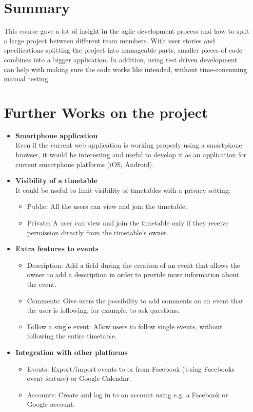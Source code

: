 
\section{Summary}
\vspace{-5mm}
This course gave a lot of insight in the agile development process and how to split a large project between different team members. With user stories and specifications splitting the project into manageable parts, smaller pieces of code combines into a bigger application. In addition, using test driven development can help with making sure the code works like intended, without time-consuming manual testing.

\section{Further Works on the project}
\vspace{-5mm}
\begin{itemize}
\item \textbf{Smartphone application}\\ Even if the current web application is working properly using a smartphone browser, it would be interesting and useful to develop it as an application for current smartphone platforms (iOS, Android).
\item \textbf{Visibility of a timetable}\\
It could be useful to limit visibility of timetables with a privacy setting:
\vspace{-3mm}
\begin{itemize}
	\item Public: All the users can view and join the timetable.
	\item Private: A user can view and join the timetable only if they receive permission directly from the timetable's owner.
\end{itemize}
\item \textbf{Extra features to events}
\vspace{-3mm}
\begin{itemize}
	\item Description: Add a field during the creation of an event that allows the owner to add a description in order to provide more information about the event.
	\item Comments: Give users the possibility to add comments on an event that the user is following, for example, to ask questions.
	\item Follow a single event: Allow users to follow single events, without following the entire timetable.
\end{itemize}
\item \textbf{Integration with other platforms}
\vspace{-3mm}
\begin{itemize}
	\item Events: Export/import events to or from Facebook (Using Facebooks event feature) or Google Calendar.
	\item Accounts: Create and log in to an account using e.g. a Facebook or Google account.
\end{itemize}
\end{itemize}

